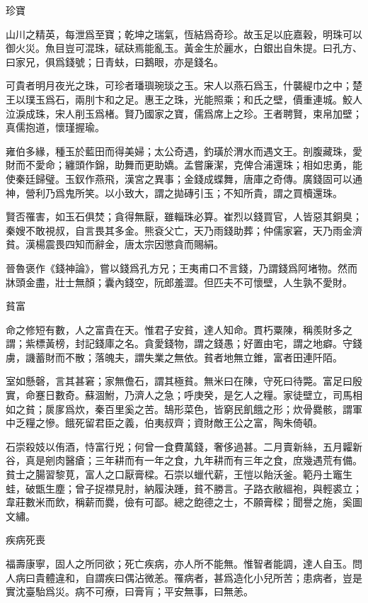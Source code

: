 \documentclass[12pt,a4paper]{ctexbook}
\begin{document}
珍寶\par
山川之精英，每泄爲至寶；乾坤之瑞氣，恆結爲奇珍。故玉足以庇嘉穀，明珠可以御火災。魚目豈可混珠，碔砆焉能亂玉。黃金生於麗水，白銀出自朱提。曰孔方、曰家兄，俱爲錢號；日青蚨，曰鵝眼，亦是錢名。\par
可貴者明月夜光之珠，可珍者璠璵琬琰之玉。宋人以燕石爲玉，什襲緹巾之中；楚王以璞玉爲石，兩刖卞和之足。惠王之珠，光能照乘；和氏之壁，價重連城。鮫人泣淚成珠，宋人削玉爲楮。賢乃國家之寶，儒爲席上之珍。王者聘賢，束帛加壁；真儒抱道，懷瑾握瑜。\par
雍伯多緣，種玉於藍田而得美婦；太公奇遇，釣璜於渭水而遇文王。剖腹藏珠，愛財而不愛命；纏頭作錦，助舞而更助嬌。孟嘗廉潔，克俾合浦還珠；相如忠勇，能使秦廷歸璧。玉釵作燕飛，漢宮之異事；金錢成蝶舞，唐庫之奇傳。廣錢固可以通神，營利乃爲鬼所笑。以小致大，謂之拋磚引玉；不知所貴，謂之買櫝還珠。\par
賢否罹害，如玉石俱焚；貪得無厭，雖輜珠必算。崔烈以錢買官，人皆惡其銅臭；秦嫂不敢視叔，自言畏其多金。熊袞父亡，天乃雨錢助葬；仲儒家窘，天乃雨金濟貧。漢楊震畏四知而辭金，唐太宗因懲貪而賜絹。\par
晉魯褒作《錢神論》，嘗以錢爲孔方兄；王夷甫口不言錢，乃謂錢爲阿堵物。然而牀頭金盡，壯士無顏；囊內錢空，阮郎羞澀。但匹夫不可懷壁，人生孰不愛財。\par
貧富\par
命之修短有數，人之富貴在天。惟君子安貧，達人知命。貫朽粟陳，稱羨財多之謂；紫標黃榜，封記錢庫之名。貪愛錢物，謂之錢愚；好置由宅，謂之地癖。守錢虜，譏蓄財而不散；落魄夫，謂失業之無依。貧者地無立錐，富者田連阡陌。\par
室如懸磬，言其甚窘；家無儋石，謂其極貧。無米曰在陳，守死曰待斃。富足曰殷實，命蹇日數奇。蘇涸鮒，乃濟人之急；呼庚癸，是乞人之糧。家徒壁立，司馬相如之貧；扊扅爲炊，秦百里奚之苦。鵠形菜色，皆窮民飢餓之形；炊骨爨骸，謂軍中乏糧之慘。餓死留君臣之義，伯夷叔齊；資財敵王公之富，陶朱倚頓。\par
石崇殺妓以侑酒，恃富行兇；何曾一食費萬錢，奢侈過甚。二月賣新絲，五月糶新谷，真是剜肉醫瘡；三年耕而有一年之食，九年耕而有三年之食，庶幾遇荒有備。貧士之腸習黎莧，富人之口厭膏樑。石崇以蠟代薪，王愷以飴沃釜。範丹土竈生蛙，破甑生塵；曾子捉襟見肘，納履決踵，貧不勝言。子路衣敝縕袍，與輕裘立；韋莊數米而飲，稱薪而爨，儉有可鄙。總之飽德之士，不願膏樑；聞譽之施，奚圖文繡。\par
疾病死喪\par
福壽康寧，固人之所同欲；死亡疾病，亦人所不能無。惟智者能調，達人自玉。問人病曰貴體違和，自謂疾曰偶沾微恙。罹病者，甚爲造化小兒所苦；患病者，豈是實沈臺駘爲災。病不可療，曰膏肓；平安無事，曰無恙。\par
\end{document}
